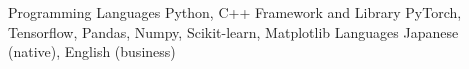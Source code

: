 
\begin{cvskills}
  \cvskill
    {Programming Languages} %
    {Python, C++} %
  \cvskill
    {Framework and Library}
    {PyTorch, Tensorflow, Pandas, Numpy, Scikit-learn, Matplotlib}
  \cvskill
    {Languages} %
    {Japanese (native), English (business)} %
\end{cvskills}
